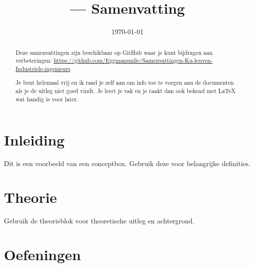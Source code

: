 \documentclass[a4paper,11pt]{article}
\title{\vaknaam{} --- Samenvatting}
\author{\auteur}
\date{\today}
\begin{document}
\maketitle
 
\begin{abstract}
Deze samenvattingen zijn beschikbaar op GitHub waar je kunt bijdragen aan verbeteringen: \url{https://github.com/Eggmansmile/Samenvattingen-Ku-leuven-Industriele-ingenieurs}

Je bent helemaal vrij en ik raad je zelf aan om info toe te voegen aan de documenten als je de uitleg niet goed vindt.
Je leert je vak en je raakt dan ook bekend met LaTeX wat handig is voor later.
\end{abstract}

\tableofcontents
\newpage


\section{Inleiding}


\begin{conceptbox}
Dit is een voorbeeld van een conceptbox. Gebruik deze voor belangrijke definities.
\end{conceptbox}

\section{Theorie}

\begin{theorieblok}
Gebruik de theorieblok voor theoretische uitleg en achtergrond.
\end{theorieblok}


\section{Oefeningen}
\end{document}
